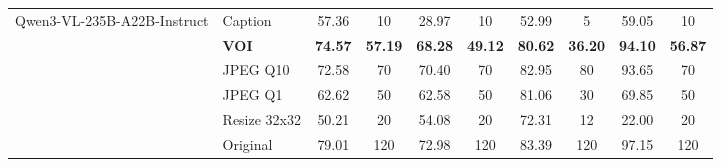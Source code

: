 \begin{table}[p]
{\begin{tabular}{llcccccccc}
\multirow{6}{*}{Qwen3-VL-235B-A22B-Instruct}
& Caption & 57.36 & 10 & 28.97 & 10 & 52.99 & 5 & 59.05 & 10 \\
& \textbf{VOI} & \textbf{74.57} & \textbf{57.19} & \textbf{68.28} & \textbf{49.12} & \textbf{80.62} & \textbf{36.20} & \textbf{94.10} & \textbf{56.87} \\
& JPEG Q10 & 72.58 & 70 & 70.40 & 70 & 82.95 & 80 & 93.65 & 70 \\
& JPEG Q1 & 62.62 & 50 & 62.58 & 50 & 81.06 & 30 & 69.85 & 50 \\
& Resize 32x32 & 50.21 & 20 & 54.08 & 20 & 72.31 & 12 & 22.00 & 20 \\
& Original & 79.01 & 120 & 72.98 & 120 & 83.39 & 120 & 97.15 & 120 \\
\bottomrule
\end{tabular}
}
\end{table}



